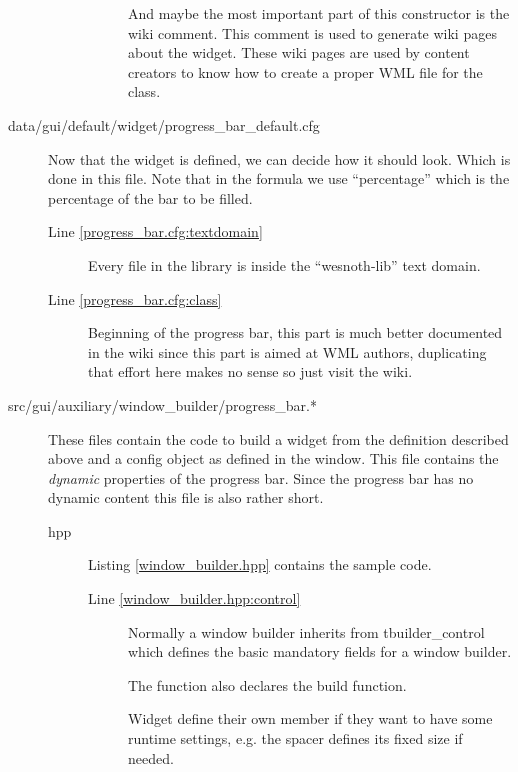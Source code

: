 \begin{description}
\begin{description}
\begin{description}
		And maybe the most important part of this constructor is the wiki
		comment. This comment is used to generate wiki pages about the widget.
		These wiki pages are used by content creators to know how to create a
		proper WML file for the class.
	\end{description}
\end{description}

\item[data/gui/default/widget/progress\_bar\_default.cfg]
	Now that the widget is defined, we can decide how it should look. Which is
	done in this file. Note that in the formula we use ``percentage'' which is
	the percentage of the bar to be filled.

	\begin{description}
	\item[Line \ref{progress_bar.cfg:textdomain}] Every file in the library
		is inside the ``wesnoth-lib'' text domain.

	\item[Line \ref{progress_bar.cfg:class}]
		Beginning of the progress bar, this part is much better documented in
		the wiki %
		since this part is aimed at WML authors, duplicating that effort here
		makes no sense so just visit the wiki.

	\end{description}

\item[src/gui/auxiliary/window\_builder/progress\_bar.*]
	These files contain the code to build a widget from the definition described
	above and a config object as defined in the window. This file contains the
	\emph{dynamic} properties of the progress bar. Since the progress bar has no
	dynamic content this file is also rather short.

\begin{description}
\item[hpp] Listing \ref{window_builder.hpp} contains the sample code. 
	\begin{description}
	\item[Line \ref{window_builder.hpp:control}] Normally a
		window builder inherits from tbuilder\_control which defines the
		basic mandatory fields for a window builder.

		The function also declares the build function.

		Widget define their own member if they want to have some runtime
		settings, e.g. the spacer defines its fixed size if needed.
	\end{description}


\end{description}
\end{description}
